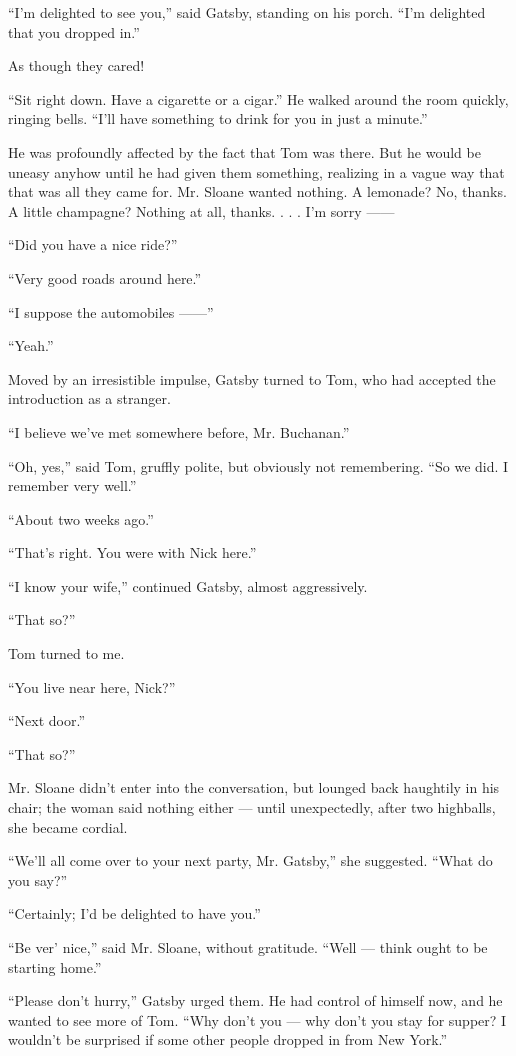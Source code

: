 \documentclass{znotebook}
\begin{document}
``I'm delighted to see you,'' said Gatsby, standing on his porch. ``I'm delighted that you dropped in.''

As though they cared!

``Sit right down. Have a cigarette or a cigar.'' He walked around the room quickly, ringing bells. ``I'll have something to drink for you in just a minute.''

He was profoundly affected by the fact that Tom was there. But he would be uneasy anyhow until he had given them something, realizing in a vague way that that was all they came for. Mr. Sloane wanted nothing. A lemonade? No, thanks. A little champagne? Nothing at all, thanks. . . . I'm sorry ——

``Did you have a nice ride?''

``Very good roads around here.''

``I suppose the automobiles ——''

``Yeah.''

Moved by an irresistible impulse, Gatsby turned to Tom, who had accepted the introduction as a stranger.

``I believe we've met somewhere before, Mr. Buchanan.''

``Oh, yes,'' said Tom, gruffly polite, but obviously not remembering. ``So we did. I remember very well.''

``About two weeks ago.''

``That's right. You were with Nick here.''

``I know your wife,'' continued Gatsby, almost aggressively.

``That so?''

Tom turned to me.

``You live near here, Nick?''

``Next door.''

``That so?''

Mr. Sloane didn't enter into the conversation, but lounged back haughtily in his chair; the woman said nothing either — until unexpectedly, after two highballs, she became cordial.

``We'll all come over to your next party, Mr. Gatsby,'' she suggested. ``What do you say?''

``Certainly; I'd be delighted to have you.''

``Be ver' nice,'' said Mr. Sloane, without gratitude. ``Well — think ought to be starting home.''

``Please don't hurry,'' Gatsby urged them. He had control of himself now, and he wanted to see more of Tom. ``Why don't you — why don't you stay for supper? I wouldn't be surprised if some other people dropped in from New York.''
\end{document}
